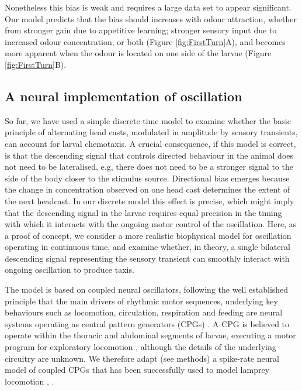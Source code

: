 \documentclass[11pt,a4paper]{article}
\begin{document}
Nonetheless this bias is weak and requires a large data set to appear significant. Our model predicts that the bias should  increases with odour attraction, whether from stronger gain due to appetitive learning; stronger sensory input due to increased odour concentration, or both (Figure \ref{fig:FirstTurn}A), and becomes more apparent when the odour is located on one side of the larvae (Figure \ref{fig:FirstTurn}B).

\subsection{A neural implementation of oscillation}
So far, we have used a simple discrete time model to examine whether the basic principle of alternating head casts, modulated in amplitude by sensory transients, can account for larval chemotaxis. A crucial consequence, if this model is correct, is that the descending signal that controls directed behaviour in the animal does not need to be lateralised, e.g, there does not need to be a stronger signal to the side of the body closer to the stimulus source. Directional bias emerges because the change in concentration observed on one head cast determines the extent of the next headcast. In our discrete model this effect is precise, which might imply that the descending signal in the larvae requires equal precision in the timing with which it interacts with the ongoing motor control of the oscillation. Here, as a proof of concept, we consider a more realistic biophysical model for oscillation operating in continuous time, and examine whether, in theory, a single bilateral descending signal representing the sensory transient can smoothly interact with ongoing oscillation to produce taxis.

The model is based on coupled neural oscillators, following the well established principle that the main drivers of rhythmic  motor sequences, underlying key behaviours such as locomotion, circulation, respiration and feeding are neural systems operating as central pattern generators (CPGs) \citep{delcomyn1980neural}. A CPG is believed to operate  within the thoracic and abdominal segments of larvae, executing a motor program for exploratory locomotion \citep{berni2012autonomous,lemon2015whole}, although the details of the underlying circuitry are unknown. We therefore adapt (see methods) a spike-rate neural model of coupled CPGs that has been successfully used to model lamprey locomotion \citep{cohen1992modelling,lansner1997realistic}, \cite[see][]{marder1996principles}.
\end{document}
